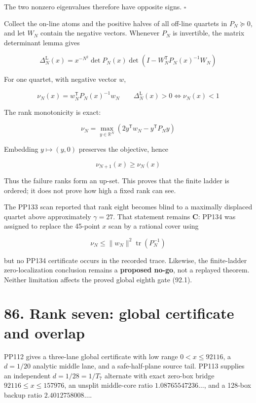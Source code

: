 \documentclass[
  11pt,
]{book}
\begin{document}
The two nonzero eigenvalues therefore have opposite signs. \(\square\)

Collect the on-line atoms and the positive halves of all off-line
quartets in \(P_N\succeq0\), and let \(W_N\) contain the negative
vectors. Whenever \(P_N\) is invertible, the matrix determinant lemma
gives

\[
\boxed{
\Delta_N^{\mathrm L}(x)
=x^{-N^2}\det P_N(x)
\det\!\left(I-W_N^{\mathsf T}P_N(x)^{-1}W_N\right)
}
\tag{102.4}
\]

For one quartet, with negative vector \(w\),

\[
\nu_N(x)=w_N^{\mathsf T}P_N(x)^{-1}w_N
\qquad
\Delta_N^{\mathrm L}(x)>0
\iff \nu_N(x)<1
\tag{102.5}
\]

The rank monotonicity is exact:

\[
\nu_N
=\max_{y\in\mathbb R^N}
\left(2y^{\mathsf T}w_N-y^{\mathsf T}P_Ny\right)
\tag{102.6}
\]

Embedding \(y\mapsto(y,0)\) preserves the objective, hence

\[
\boxed{\nu_{N+1}(x)\ge\nu_N(x)}
\tag{102.7}
\]

Thus the failure ranks form an up-set. This proves that the finite
ladder is ordered; it does not prove how high a fixed rank can see.

The PP133 scan reported that rank eight becomes blind to a maximally
displaced quartet above approximately \(\gamma=27\). That statement
remains \textbf{C}: PP134 was assigned to replace the 45-point \(x\)
scan by a rational cover using

\[
\nu_N\le \|w_N\|^2\operatorname{tr}(P_N^{-1})
\tag{102.8}
\]

but no PP134 certificate occurs in the recorded trace. Likewise, the
finite-ladder zero-localization conclusion remains a \textbf{proposed
no-go}, not a replayed theorem. Neither limitation affects the proved
global eighth gate (92.1).

\section{86. Rank seven: global certificate and
overlap}\label{rank-seven-global-certificate-and-overlap}

PP112 gives a three-lane global certificate with low range
\(0<x\le92116\), a \(d=1/20\) analytic middle lane, and a
safe-half-plane source tail. PP113 supplies an independent
\(d=1/28=1/T_7\) alternate with exact zero-box bridge
\(92116\le x\le157976\), an unsplit middle-core ratio
\(1.08765547236\ldots\), and a 128-box backup ratio
\(2.4012758008\ldots\).
\end{document}
